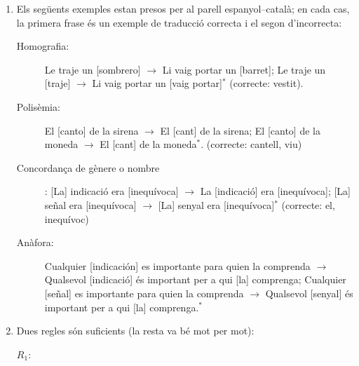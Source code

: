\begin{enumerate}
\item 
   Els següents exemples estan presos per al parell 
   espanyol--català; en cada cas, la primera frase és un exemple de
   traducció correcta i el segon d'incorrecta:
   \begin{description}
   \item[Homografia:] Le traje un [sombrero] $\rightarrow$ 
     Li vaig portar un [barret]; 
     Le traje un [traje] $\rightarrow$ Li vaig portar un [vaig
     portar]$^*$ (correcte: vestit). 
    \item[Polisèmia:] El [canto] de la sirena $\rightarrow$ 
     El [cant] de la sirena;
     El [canto] de la moneda $\rightarrow$ El [cant] de la moneda$^*$.
     (correcte: cantell, viu)
     \item[Concordança de gènere o nombre]: 
     [La] indicació era [inequívoca]
     $\rightarrow$ La [indicació] era [inequívoca]; 
     [La] señal era [inequívoca]
     $\rightarrow$ [La] senyal era [inequívoca]$^*$ (correcte: 
     el, inequívoc)
     \item[Anàfora:] Cualquier [indicación] es importante para quien la
     comprenda $\rightarrow$ Qualsevol [indicació] és important per a qui [la]
     comprenga; Cualquier [señal] es importante para quien la
     comprenda $\rightarrow$ Qualsevol [senyal] és important per a qui [la]
     comprenga.$^*$
 \end{description}

\item  Dues regles són suficients (la resta va bé mot per mot):
 
  \begin{description}
  \item[$R_1$:] 


\end{description}
\end{enumerate}
